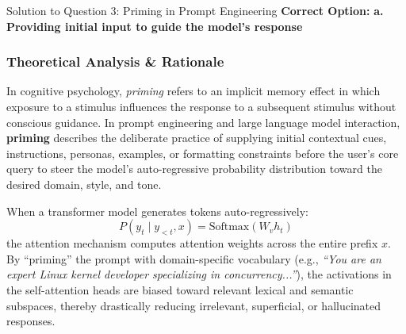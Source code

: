\documentclass[11pt,a4paper]{article}
\begin{document}
\begin{solutionbox}{Solution to Question 3: Priming in Prompt Engineering}
\textbf{Correct Option:} \textbf{a. Providing initial input to guide the model's response}

\subsubsection*{Theoretical Analysis \& Rationale}
In cognitive psychology, \textit{priming} refers to an implicit memory effect in which exposure to a stimulus influences the response to a subsequent stimulus without conscious guidance. In prompt engineering and large language model interaction, \textbf{priming} describes the deliberate practice of supplying initial contextual cues, instructions, personas, examples, or formatting constraints before the user's core query to steer the model's auto-regressive probability distribution toward the desired domain, style, and tone.

When a transformer model generates tokens auto-regressively:
\begin{equation*}
P(y_t \mid y_{<t}, x) = \text{Softmax}\left( W_v h_t \right)
\end{equation*}
the attention mechanism computes attention weights across the entire prefix $x$. By ``priming'' the prompt with domain-specific vocabulary (e.g., \textit{``You are an expert Linux kernel developer specializing in concurrency...''}), the activations in the self-attention heads are biased toward relevant lexical and semantic subspaces, thereby drastically reducing irrelevant, superficial, or hallucinated responses.


\end{solutionbox}
\end{document}
